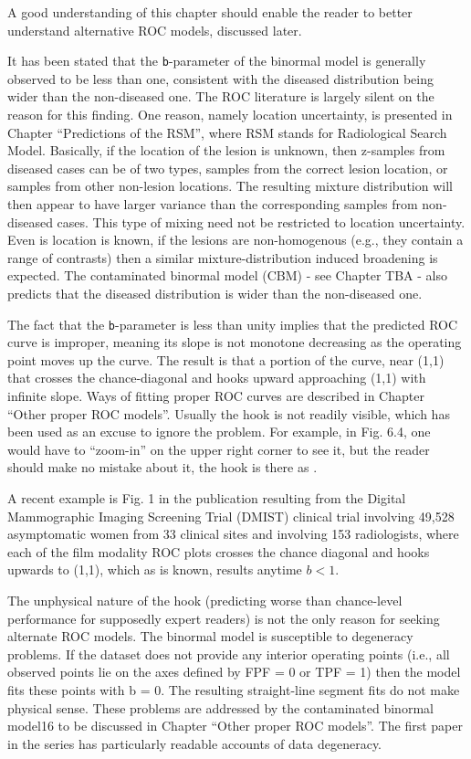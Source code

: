 \documentclass[
]{book}
\begin{document}
A good understanding of this chapter should enable the reader to better understand alternative ROC models, discussed later.

It has been stated that the \texttt{b}-parameter of the binormal model is generally observed to be less than one, consistent with the diseased distribution being wider than the non-diseased one. The ROC literature is largely silent on the reason for this finding. One reason, namely location uncertainty, is presented in Chapter ``Predictions of the RSM'', where RSM stands for Radiological Search Model. Basically, if the location of the lesion is unknown, then z-samples from diseased cases can be of two types, samples from the correct lesion location, or samples from other non-lesion locations. The resulting mixture distribution will then appear to have larger variance than the corresponding samples from non-diseased cases. This type of mixing need not be restricted to location uncertainty. Even is location is known, if the lesions are non-homogenous (e.g., they contain a range of contrasts) then a similar mixture-distribution induced broadening is expected. The contaminated binormal model (CBM) - see Chapter TBA - also predicts that the diseased distribution is wider than the non-diseased one.

The fact that the \texttt{b}-parameter is less than unity implies that the predicted ROC curve is improper, meaning its slope is not monotone decreasing as the operating point moves up the curve. The result is that a portion of the curve, near (1,1) that crosses the chance-diagonal and hooks upward approaching (1,1) with infinite slope. Ways of fitting proper ROC curves are described in Chapter ``Other proper ROC models''. Usually the hook is not readily visible, which has been used as an excuse to ignore the problem. For example, in Fig. 6.4, one would have to ``zoom-in'' on the upper right corner to see it, but the reader should make no mistake about it, the hook is there as .

A recent example is Fig. 1 in the publication resulting from the Digital Mammographic Imaging Screening Trial (DMIST) clinical trial \citep{RN1784} involving 49,528 asymptomatic women from 33 clinical sites and involving 153 radiologists, where each of the film modality ROC plots crosses the chance diagonal and hooks upwards to (1,1), which as is known, results anytime \(b <1\).

The unphysical nature of the hook (predicting worse than chance-level performance for supposedly expert readers) is not the only reason for seeking alternate ROC models. The binormal model is susceptible to degeneracy problems. If the dataset does not provide any interior operating points (i.e., all observed points lie on the axes defined by FPF = 0 or TPF = 1) then the model fits these points with b = 0. The resulting straight-line segment fits do not make physical sense. These problems are addressed by the contaminated binormal model16 to be discussed in Chapter ``Other proper ROC models''. The first paper in the series has particularly readable accounts of data degeneracy.
\end{document}
